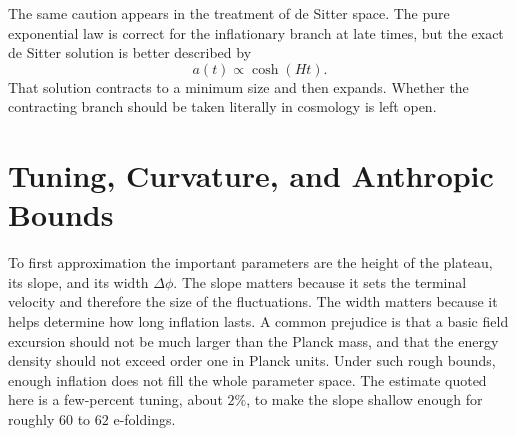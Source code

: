 The same caution appears in the treatment of de Sitter space. The pure exponential law is correct for the inflationary branch at late times, but the exact de Sitter solution is better described by
\begin{equation}
a(t)\propto \cosh(Ht).
\end{equation}
That solution contracts to a minimum size and then expands. Whether the contracting branch should be taken literally in cosmology is left open.

\begin{classroomqa}
\end{classroomqa}

\section{Tuning, Curvature, and Anthropic Bounds}

To first approximation the important parameters are the height of the plateau, its slope, and its width \(\Delta\phi\). The slope matters because it sets the terminal velocity and therefore the size of the fluctuations. The width matters because it helps determine how long inflation lasts. A common prejudice is that a basic field excursion should not be much larger than the Planck mass, and that the energy density should not exceed order one in Planck units. Under such rough bounds, enough inflation does not fill the whole parameter space. The estimate quoted here is a few-percent tuning, about \(2\%\), to make the slope shallow enough for roughly \(60\) to \(62\) e-foldings.

\begin{classroomqa}
\end{classroomqa}

